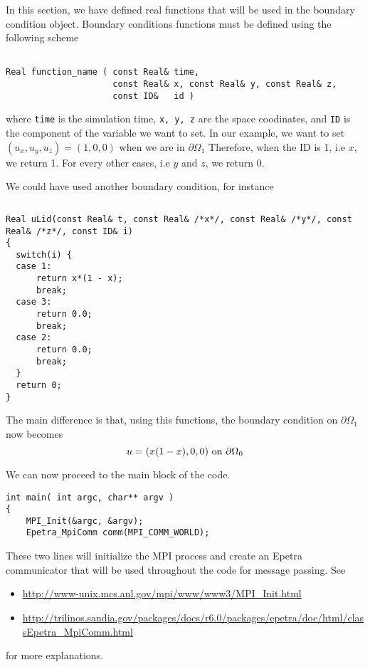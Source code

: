 In this section, we have defined real functions that will be used in the boundary condition
object. Boundary conditions functions must be defined using the following scheme

\begin{verbatim}

Real function_name ( const Real& time,
                     const Real& x, const Real& y, const Real& z,
                     const ID&   id )

\end{verbatim}

where
\verb|time|
is the simulation time,
\verb|x, y, z|
are the space coodinates, and
\verb|ID|
is the component of the variable we want to set.
In our example, we want to set $(u_x, u_y, u_z) = (1, 0, 0)$ when we are in ${\partial \Omega}_1$
Therefore, when the ID is 1, i.e $x$, we return 1. For every other cases, i.e $y$ and $z$,
we return 0. 

We could have used another boundary condition, for instance 

\begin{verbatim}\end{verbatim}
\begin{verbatim}
Real uLid(const Real& t, const Real& /*x*/, const Real& /*y*/, const Real& /*z*/, const ID& i)
{
  switch(i) {
  case 1:
      return x*(1 - x);
      break;
  case 3:
      return 0.0;
      break;
  case 2:
      return 0.0;
      break;
  }
  return 0;
}
\end{verbatim}


The main difference is that, using this functions, the boundary condition on ${\partial \Omega}_1$
now becomes
\begin{equation*}
  u = (x(1 - x), 0, 0) \mbox{ on } {\partial \Omega}_0 \\
\end{equation*}

We can now proceed to the main block of the code.

\begin{verbatim}
int main( int argc, char** argv )
{
    MPI_Init(&argc, &argv);
    Epetra_MpiComm comm(MPI_COMM_WORLD);

\end{verbatim}

These two lines will initialize the MPI process and create an Epetra communicator
that will be used throughout the code for message passing. See
\begin{itemize}
\item \url{http://www-unix.mcs.anl.gov/mpi/www/www3/MPI\_Init.html}
\item \url{http://trilinos.sandia.gov/packages/docs/r6.0/packages/epetra/doc/html/classEpetra\_MpiComm.html}
\end{itemize}
for more explanations.

